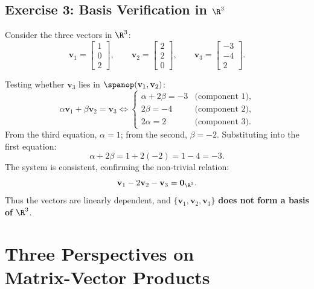 \subsection{Exercise 3: Basis Verification in \texorpdfstring{$\R^3$}{R3}}

Consider the three vectors in $\R^3$:
\begin{equation}
    \mathbf{v}_1 = \begin{bmatrix} 1 \\ 0 \\ 2 \end{bmatrix}, \qquad \mathbf{v}_2 = \begin{bmatrix} 2 \\ 2 \\ 0 \end{bmatrix}, \qquad \mathbf{v}_3 = \begin{bmatrix} -3 \\ -4 \\ 2 \end{bmatrix}.
\end{equation}

Testing whether $\mathbf{v}_3$ lies in $\spanop(\mathbf{v}_1, \mathbf{v}_2)$:
\begin{equation}
    \alpha \mathbf{v}_1 + \beta \mathbf{v}_2 = \mathbf{v}_3 \iff \begin{cases}
        \alpha + 2\beta = -3 & \text{(component 1)}, \\
        2\beta = -4 & \text{(component 2)}, \\
        2\alpha = 2 & \text{(component 3)}.
    \end{cases}
\end{equation}
From the third equation, $\alpha = 1$; from the second, $\beta = -2$. Substituting into the first equation:
\begin{equation}
    \alpha + 2\beta = 1 + 2(-2) = 1 - 4 = -3.
\end{equation}
The system is consistent, confirming the non-trivial relation:
\begin{equation}
    \mathbf{v}_1 - 2\mathbf{v}_2 - \mathbf{v}_3 = \mathbf{0}_{\R^3}.
\end{equation}
Thus the vectors are linearly dependent, and $\{\mathbf{v}_1, \mathbf{v}_2, \mathbf{v}_3\}$ \textbf{does not form a basis of $\R^3$}.

\FloatBarrier
\section[Three Perspectives on Matrix-Vector Products]{Three Perspectives on\\ Matrix-Vector Products}

